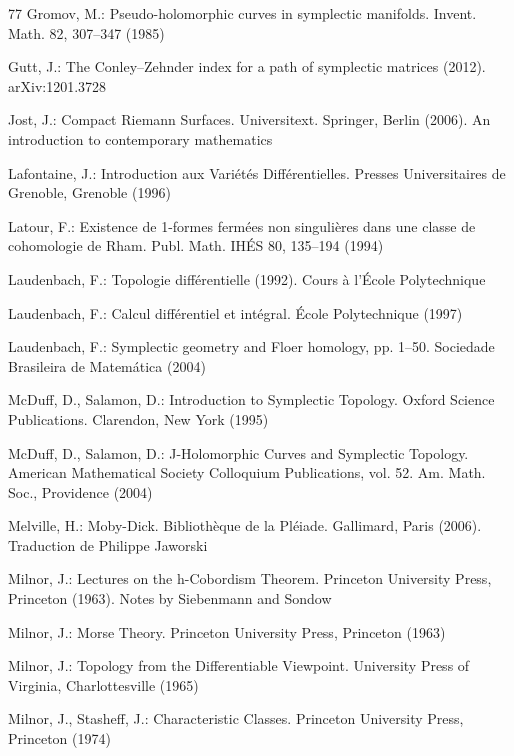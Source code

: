 \begin{thebibliography}{77}
 Gromov, M.: Pseudo-holomorphic curves in symplectic manifolds. Invent. Math. 82, 307–347 (1985)

 Gutt, J.: The Conley–Zehnder index for a path of symplectic matrices (2012). arXiv:1201.3728

 Jost, J.: Compact Riemann Surfaces. Universitext. Springer, Berlin (2006). An introduction to contemporary mathematics

 Lafontaine, J.: Introduction aux Variétés Différentielles. Presses Universitaires de Grenoble, Grenoble (1996)

 Latour, F.: Existence de 1-formes fermées non singulières dans une classe de cohomologie de Rham. Publ. Math. IHÉS 80, 135–194 (1994)

 Laudenbach, F.: Topologie différentielle (1992). Cours à l’École Polytechnique

 Laudenbach, F.: Calcul différentiel et intégral. École Polytechnique (1997)

 Laudenbach, F.: Symplectic geometry and Floer homology, pp. 1–50. Sociedade Brasileira de Matemática (2004)

 McDuff, D., Salamon, D.: Introduction to Symplectic Topology. Oxford Science Publications. Clarendon, New York (1995)

 McDuff, D., Salamon, D.: J-Holomorphic Curves and Symplectic Topology. American Mathematical Society Colloquium Publications, vol. 52. Am. Math. Soc., Providence (2004)

 Melville, H.: Moby-Dick. Bibliothèque de la Pléiade. Gallimard, Paris (2006). Traduction de Philippe Jaworski

 Milnor, J.: Lectures on the h-Cobordism Theorem. Princeton University Press, Princeton (1963). Notes by Siebenmann and Sondow

 Milnor, J.: Morse Theory. Princeton University Press, Princeton (1963)

 Milnor, J.: Topology from the Differentiable Viewpoint. University Press of Virginia, Charlottesville (1965)

 Milnor, J., Stasheff, J.: Characteristic Classes. Princeton University Press, Princeton (1974)


\end{thebibliography}
